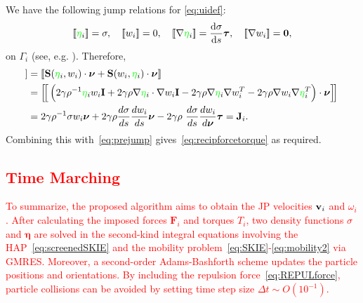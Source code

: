 \documentclass[lineno]{jfm}
\newcommand{\eeta}{\boldsymbol{\eta}}
\newcommand{\FF}{\mathbf{F}}
\newcommand{\JJ}{\mathbf{J}}
\newcommand{\nnu}{\boldsymbol{\nu}}
\newcommand{\ttau}{\boldsymbol{\tau}}
\renewcommand{\SS}{\mathbf{S}}
\newcommand{\jump}[1]{[\![ #1 ]\!]}
\newcommand{\ReviewerOne}[1]{\textcolor{red}{#1}}
\newcommand{\ReviewerTwo}[1]{\textcolor{green}{#1}}
\begin{document}
We have the following jump relations for \eqref{eq:uidef}: 
\begin{equation}
\label{eq:DLjump}
\jump{\ReviewerTwo{\eta}_i} = \sigma, \quad
\jump{w_i} = 0, \quad
\jump{\nabla \ReviewerTwo{\eta}_i} = \frac{\dif \sigma}{\dif s}\ttau,\quad
\jump{\nabla w_i} = \mathbf{0},
\end{equation}
on $\Gamma_i$ (see, e.g. \cite{KlBaGrON13}). Therefore,
\begin{align*}
  \jump{{\bf T}_2 \cdot \nnu}   &= \jump{\SS(\ReviewerTwo{\eta}_i,w_i) \cdot \nnu +
    \SS(w_i,\ReviewerTwo{\eta}_i) \cdot \nnu} \\
  &= \Big[\!\Big[ \left( 2\gamma\rho^{-1} \ReviewerTwo{\eta}_i w_i \mathbf{I} + 2\gamma\rho \nabla \ReviewerTwo{\eta}_i \cdot \nabla w_i \mathbf{I} 
- 2\gamma\rho \nabla \ReviewerTwo{\eta}_i  \nabla w_i^T - 2\gamma\rho \nabla w_i \nabla
  \ReviewerTwo{\eta}_i^T\right) \cdot \nnu \Big]\!\Big] \\
&= 2\gamma\rho^{-1} \sigma w_i \nnu + 2\gamma\rho \frac{d\sigma }{ds}\frac{dw_i }{ds} \nnu
- 2\gamma\rho \ \frac{d\sigma }{ds} \frac{dw_i }{d\nnu} \ttau = \JJ_i.
\end{align*}
Combining this with~\eqref{eq:prejump} gives~\eqref{eq:recipforcetorque}
as required. 


\ReviewerOne{
\subsection{Time Marching}
To summarize, the proposed algorithm aims to obtain the JP velocities ${\bf v}_i$ and $\omega_i$. 
After calculating the imposed forces $\FF_i$ and torques $T_i$, 
two density functions $\sigma$ and  $\eeta$ are solved in the second-kind integral equations involving the HAP~\eqref{eq:screenedSKIE} and the mobility problem~\eqref{eq:SKIE}-\eqref{eq:mobility2} via GMRES.
Moreover, a second-order Adams-Bashforth
scheme updates the particle positions and orientations. By including the
repulsion force~\eqref{eq:REPULforce}, particle collisions can be avoided by setting time step
size $\Delta t\sim O(10^{-1})$.
}
\end{document}
